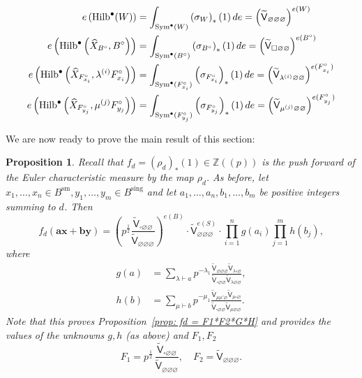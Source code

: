 \documentclass[12pt]{amsart}
\newtheorem{proposition}[theorem]{Proposition}
\theoremstyle{definition}
\newcommand{\ZZ} {\mathbb{Z}}		%
\newcommand{\sfVtilde}{\widetilde{\mathsf{V}}}
\newcommand{\Sym}{\operatorname{Sym}}
\newcommand{\Hilb}{\operatorname{Hilb}}
\newcommand{\sm}{\operatorname{sm}}
\newcommand{\sing}{\operatorname{sing}}
\newcommand{\boldx}{\boldsymbol{x}}
\newcommand{\boldy}{\boldsymbol{y}}
\newcommand{\bolda}{\boldsymbol{a}}
\newcommand{\boldb}{\boldsymbol{b}}
\renewcommand{\emptyset}{\varnothing}
\newcommand{\Xhat}{\widehat{X}}
\newcommand{\half}{\frac{1}{2}}
\newcommand{\bx}{\square}
\begin{document}
\begin{align}\label{eqn: e(Hilb(Xhat,Bcirc))=V^{e(Bcirc)}}
e\left(\Hilb^{\bullet}(W) \right) & = \int_{\Sym^{\bullet}(W)}
\left(\sigma_{W} \right)_{*}(1)\, de = \left(\sfVtilde_{\emptyset \emptyset \emptyset }\right)^{e(W)}\\
e\left(\Hilb^{\bullet}\left(\Xhat_{B^{\circ}},B^{\circ} \right) \right) & = \int_{\Sym^{\bullet}(B^{\circ })}
\left(\sigma_{B^{\circ }} \right)_{*}(1)\, de = \left(\sfVtilde_{\bx \emptyset \emptyset }\right)^{e(B^{\circ })}\nonumber \\
e\left(\Hilb^{\bullet}\left(\Xhat_{F_{x_{i}}^{\circ}},\lambda^{(i)}F_{x_{i}}^{\circ} \right) \right) & = \int_{\Sym^{\bullet}(F_{x_{i}}^{\circ })}
\left(\sigma_{F_{x_{i}}^{\circ }} \right)_{*}(1)\, de = \left(\sfVtilde_{\lambda^{(i)} \emptyset  \emptyset }\right)^{e(F_{_{x_{i}}}^{\circ })}\nonumber \\
e\left(\Hilb^{\bullet}\left(\Xhat_{F_{y_{j}}^{\circ}},\mu^{(j)}F_{y_{j}}^{\circ} \right) \right) & = \int_{\Sym^{\bullet}(F_{y_{j}}^{\circ })}
\left(\sigma_{F_{y_{j}}^{\circ }} \right)_{*}(1)\, de =
\left(\sfVtilde_{\mu^{(j)} \emptyset  \emptyset
}\right)^{e(F_{_{y_{j}}}^{\circ })} \nonumber
\end{align}







We are now ready to prove the main result of this section:

\begin{proposition}\label{prop: formula for fd in terms of the
normalized vertex} Recall that $f_{d}=\left(\rho_{d} \right)_{*}(1)\in
\ZZ (\!(p)\!)$ is the push forward of the Euler characteristic measure by
the map $\rho_{d}$. As before, let $x_{1},\dotsc ,x_{n}\in
B^{\sm},y_{1},\dotsc ,y_{m}\in B^{\sing }$ and let $a_{1},\dotsc
,a_{n},b_{1},\dotsc ,b_{m}$ be positive integers summing to $d$. Then
\[
f_{d}\left(\bolda \boldx +\boldb \boldy  \right)  =
\left(p^{\half}\frac{\sfVtilde_{\bx \emptyset
\emptyset}}{\sfVtilde_{\emptyset \emptyset \emptyset}} \right)^{e(B)}
\cdot \sfVtilde^{e(S)}_{\emptyset \emptyset \emptyset} \cdot
\prod_{i=1}^{n}g(a_{i}) \prod_{j=1}^{m} h(b_{j}),
\]
where
\begin{align*}
g(a)& = \sum_{\lambda \vdash a} p^{-\lambda_{1}}
\frac{\sfVtilde_{\emptyset \emptyset \emptyset} \sfVtilde_{\lambda \bx 
\emptyset}}{\sfVtilde_{\bx \emptyset \emptyset} \sfVtilde_{\lambda
\emptyset \emptyset}},\\
h(b) &= \sum_{\mu \vdash b} p^{-\mu_{1}} \frac{\sfVtilde_{\mu \mu'
\emptyset} \sfVtilde_{ \mu \bx \emptyset}}{\sfVtilde_{\bx \emptyset
\emptyset} \sfVtilde_{\mu \emptyset \emptyset}}.
\end{align*}
Note that this proves Proposition~\ref{prop: fd = F1*F2*G*H} and
provides the values of the unknowns $g,h$ (as above) and
$F_{1},F_{2}$
\[
F_{1} = p^{\half}\,\frac{\sfVtilde_{\bx \emptyset
\emptyset}}{\sfVtilde_{\emptyset \emptyset \emptyset}} , \quad
F_{2} =\sfVtilde_{\emptyset \emptyset \emptyset}. 
\]
\end{proposition}
\end{document}
